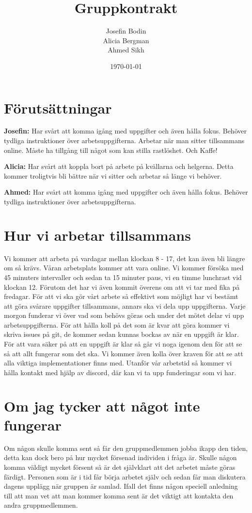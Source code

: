 \documentclass{TDP005mall}
\author{Josefin Bodin\\
  Alicia Bergman\\
Ahmed Sikh}
\title{Gruppkontrakt}
\date{\today}
\begin{document}
\projectpage


\section{Förutsättningar}
\label{prereq}
\textbf{ Josefin:}
Har svårt att komma igång med uppgifter och även hålla fokus. Behöver tydliga instruktioner över arbetsuppgifterna. Arbetar när man sitter tillsammans online. Måste ha tillgång till något som kan stilla rastlöshet. Och Kaffe!

\textbf{Alicia:}
Har svårt att koppla bort på arbete på kvällarna och helgerna. Detta kommer troligtvis bli bättre när vi sitter och arbetar så länge vi behöver.

\textbf{Ahmed:}
Har svårt att komma igång med uppgifter och även hålla fokus. Behöver tydliga instruktioner över arbetsuppgifterna.

\section{Hur vi arbetar tillsammans}

Vi kommer att arbeta på vardagar mellan klockan 8 - 17, det kan även bli längre om så krävs. Våran arbetsplats kommer att vara online. Vi kommer försöka med 45 minuters intervaller och sedan ta 15 minuter paus, vi en timme lunchrast vid klockan 12. Förutom det har vi även kommit överens om att vi tar med fika på fredagar. För att vi ska gör vårt arbete så effektivt som möjligt har vi bestämt att göra svårare uppgifter tillsammans, annars ska vi dela upp uppgifterna. Varje morgon funderar vi över vad som behövs göras och under det mötet delar vi upp arbetsuppgifterna. För att hålla koll på det som är kvar att göra kommer vi skriva issues på git, de kommer sedan kunnas bockas av när en uppgift är klar. För att vara säker på att en uppgift är klar så går vi noga igenom den för att se så att allt fungerar som det ska. Vi kommer även kolla över kraven för att se att alla viktiga implementationer finns med. Utanför vår arbetstid så kommer vi hålla kontakt med hjälp av discord, där kan vi ta upp funderingar som vi har.




\section{Om jag tycker att något inte fungerar}
Om någon skulle komma sent så får den gruppmedlemmen jobba ikapp den tiden, detta kan dock bero på hur mycket försenad individen i fråga är. Skulle någon komma väldigt mycket försent så är det självklart att det arbetet måste göras färdigt. Personen som är i tid får börja arbetet själv och sedan får man diskutera dagens upplägg när gruppen är samlad.  Ifall det finns någon speciell anledning till att man vet att man kommer komma sent är det viktigt att kontakta den andra gruppmedlemmen.
\end{document}
